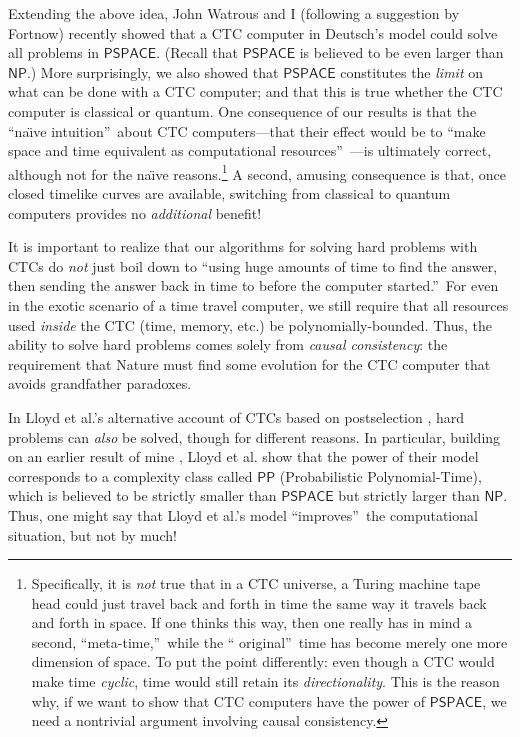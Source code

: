 \documentclass[12pt,onecolumn]{article}%
\begin{document}
Extending the above idea, John Watrous and I \cite{awat} (following a
suggestion by Fortnow) recently showed that a CTC computer in Deutsch's model
could solve all problems in $\mathsf{PSPACE}$. (Recall that $\mathsf{PSPACE}%
$ is believed to be even larger than $\mathsf{NP}$.) More surprisingly, we
also showed that $\mathsf{PSPACE}$ constitutes the \textit{limit} on what can
be done with a CTC computer; and that this is true whether the CTC computer is
classical or quantum. One consequence of our results is that the
\textquotedblleft na\"{\i}ve intuition\textquotedblright\  about CTC
computers---that their effect would be to \textquotedblleft make space and
time equivalent as computational resources\textquotedblright\ ---is ultimately
correct, although not for the na\"{\i}ve reasons.\footnote{Specifically, it
is \textit{not} true that in a CTC universe, a Turing machine tape head could
just travel back and forth in time the same way it travels back and forth in
space. If one thinks this way, then one really has in mind a second,
\textquotedblleft meta-time,\textquotedblright\  while the \textquotedblleft
original\textquotedblright\  time has become merely one more dimension of
space. To put the point differently: even though a CTC would make time
\textit{cyclic}, time would still retain its \textit{directionality}. This
is the reason why, if we want to show that CTC computers have the power of
$\mathsf{PSPACE}$, we need a nontrivial argument involving causal
consistency.} A second, amusing consequence is that, once closed timelike
curves are available, switching from classical to quantum computers provides
no \textit{additional} benefit!

It is important to realize that our algorithms for solving hard problems with
CTCs do \textit{not} just boil down to \textquotedblleft using huge amounts of
time to find the answer, then sending the answer back in time to before the
computer started.\textquotedblright\  For even in the exotic scenario of a
time travel computer, we still require that all resources used \textit{inside}
the CTC (time, memory, etc.) be polynomially-bounded. Thus, the ability to
solve hard problems comes solely from \textit{causal consistency}: the
requirement that Nature must find some evolution for the CTC computer that
avoids grandfather paradoxes.

In Lloyd et al.'s alternative account of CTCs based on postselection
\cite{lmggs}, hard problems can \textit{also} be solved, though for different
reasons. In particular, building on an earlier result of mine \cite{aar:pp},
Lloyd et al. show that the power of their model corresponds to a complexity
class called $\mathsf{PP}$ (Probabilistic Polynomial-Time), which is believed
to be strictly smaller than $\mathsf{PSPACE}$ but strictly larger than
$\mathsf{NP}$. Thus, one might say that Lloyd et al.'s model
\textquotedblleft improves\textquotedblright\  the computational situation, but
not by much!
\end{document}
